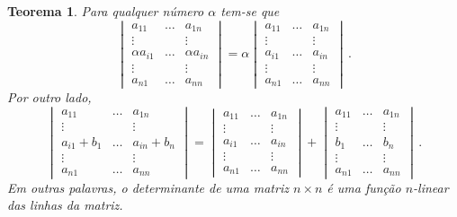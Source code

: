 \documentclass[12pt,a4paper]{report}
\newtheorem{thm}{Teorema}[chapter]
\begin{document}
\begin{thm}
  \label{det.lin}
  Para qualquer número $\alpha$ tem-se que
  $$\begin{vmatrix}
    a_{11}&\ldots& a_{1n}\\
    \vdots&&\vdots\\
    \alpha a_{i1}&\ldots&\alpha a_{in}\\
    \vdots&&\vdots\\
    a_{n1}&\ldots&a_{nn}
  \end{vmatrix}=\alpha\begin{vmatrix}
    a_{11}&\ldots& a_{1n}\\
    \vdots&&\vdots\\
    a_{i1}&\ldots& a_{in}\\
    \vdots&&\vdots\\
    a_{n1}&\ldots&a_{nn}
  \end{vmatrix}\,.$$
  Por outro lado,
  $$\begin{vmatrix}
    a_{11}&\ldots& a_{1n}\\
    \vdots&&\vdots\\
    a_{i1}+b_1&\ldots&a_{in}+b_n\\
    \vdots&&\vdots\\
    a_{n1}&\ldots&a_{nn}
  \end{vmatrix}=\begin{vmatrix}
    a_{11}&\ldots& a_{1n}\\
    \vdots&&\vdots\\
    a_{i1}&\ldots& a_{in}\\
    \vdots&&\vdots\\
    a_{n1}&\ldots&a_{nn}
  \end{vmatrix}+\begin{vmatrix}
    a_{11}&\ldots& a_{1n}\\
    \vdots&&\vdots\\
    b_1&\ldots& b_n\\
    \vdots&&\vdots\\
    a_{n1}&\ldots&a_{nn}
  \end{vmatrix}\,.$$
  Em outras palavras, o determinante de uma matriz $n\times n$ é uma função $n$-linear das linhas da matriz.
\end{thm}
\end{document}
